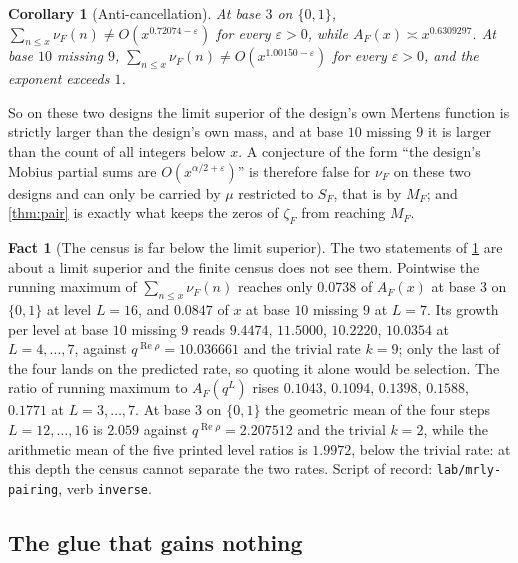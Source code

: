 \documentclass[11pt]{amsart}
\newtheorem{corollary}[theorem]{Corollary}
\theoremstyle{definition}
\newtheorem{fact}[theorem]{Fact}
\theoremstyle{remark}
\begin{document}
\begin{corollary}[Anti-cancellation]
\label{cor:anti}
At base $3$ on $\{0,1\}$, $\sum_{n \le x} \nu_{F}(n) \ne O(x^{0.72074 - \varepsilon})$ for every $\varepsilon > 0$, while $A_{F}(x) \asymp x^{0.6309297}$. At base $10$ missing $9$, $\sum_{n \le x} \nu_{F}(n) \ne O(x^{1.00150 - \varepsilon})$ for every $\varepsilon > 0$, and the exponent exceeds $1$.
\end{corollary}

So on these two designs the limit superior of the design's own Mertens function is strictly larger than the design's own mass, and at base $10$ missing $9$ it is larger than the count of all integers below $x$. A conjecture of the form ``the design's Mobius partial sums are $O(x^{\alpha/2 + \varepsilon})$'' is therefore false for $\nu_{F}$ on these two designs and can only be carried by $\mu$ restricted to $S_{F}$, that is by $M_{F}$; and \cref{thm:pair} is exactly what keeps the zeros of $\zeta_{F}$ from reaching $M_{F}$.

\begin{fact}[The census is far below the limit superior]
\label{fact:census}
The two statements of \cref{cor:anti} are about a limit superior and the finite census does not see them. Pointwise the running maximum of $\sum_{n \le x} \nu_{F}(n)$ reaches only $0.0738$ of $A_{F}(x)$ at base $3$ on $\{0,1\}$ at level $L = 16$, and $0.0847$ of $x$ at base $10$ missing $9$ at $L = 7$. Its growth per level at base $10$ missing $9$ reads $9.4474$, $11.5000$, $10.2220$, $10.0354$ at $L = 4,\dots,7$, against $q^{\operatorname{Re}\rho} = 10.036661$ and the trivial rate $k = 9$; only the last of the four lands on the predicted rate, so quoting it alone would be selection. The ratio of running maximum to $A_{F}(q^{L})$ rises $0.1043$, $0.1094$, $0.1398$, $0.1588$, $0.1771$ at $L = 3,\dots,7$. At base $3$ on $\{0,1\}$ the geometric mean of the four steps $L = 12,\dots,16$ is $2.059$ against $q^{\operatorname{Re}\rho} = 2.207512$ and the trivial $k = 2$, while the arithmetic mean of the five printed level ratios is $1.9972$, below the trivial rate: at this depth the census cannot separate the two rates. Script of record: \texttt{lab/mrly-pairing}, verb \texttt{inverse}.
\end{fact}

\subsection{The glue that gains nothing}
\label{sub:glue}
\end{document}
